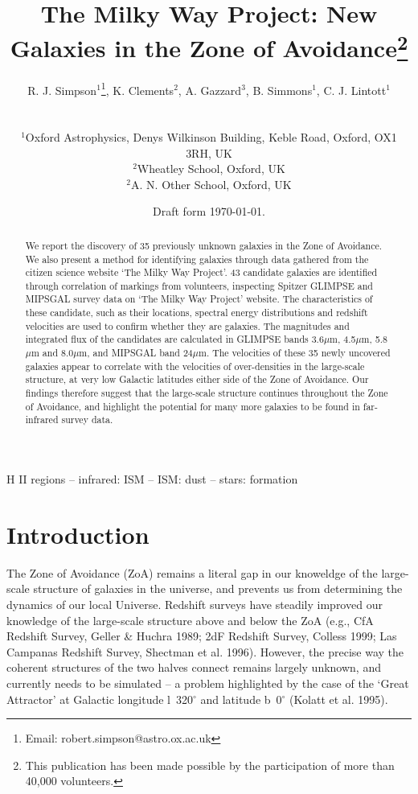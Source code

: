 \documentclass[times,usenatbib]{mn2e}
\title[New Galaxies in the ZoA]{The Milky Way Project: New Galaxies in the Zone of Avoidance\footnote{This publication has been made possible by the participation of more than 40,000 volunteers.}}
\author[Simpson et al.]
{\parbox{\textwidth}{R. J. Simpson$^{1}$\thanks{Email: robert.simpson@astro.ox.ac.uk},
K. Clements$^{2}$,
A. Gazzard$^{3}$,
B. Simmons$^{1}$,
C. J. Lintott$^{1}$}\vspace{0.8cm}\\
\parbox{\textwidth}{
$^{1}$Oxford Astrophysics, Denys Wilkinson Building, Keble Road, Oxford, OX1 3RH, UK \\
$^{2}$Wheatley School, Oxford, UK \\
$^{2}$A. N. Other School, Oxford, UK }}
\date{Draft form \today .}
\begin{document}
\label{firstpage}

\maketitle

\begin{abstract}

We report the discovery of 35 previously unknown galaxies in the Zone of Avoidance. We also present a method for identifying galaxies through data gathered from the citizen science website `The Milky Way Project'. 43 candidate galaxies are identified through correlation of markings from volunteers, inspecting Spitzer GLIMPSE and MIPSGAL survey data on `The Milky Way Project' website. The characteristics of these candidate, such as their locations, spectral energy distributions and redshift velocities are used to confirm whether they are galaxies. The magnitudes and integrated flux of the candidates are calculated in GLIMPSE bands 3.6$\mu$m, 4.5$\mu$m, 5.8$\mu$m and 8.0$\mu$m, and MIPSGAL band 24$\mu$m. The velocities of these 35 newly uncovered galaxies appear to correlate with the velocities of over-densities in the large-scale structure, at very low Galactic latitudes either side of the Zone of Avoidance. Our findings therefore suggest that the large-scale structure continues throughout the Zone of Avoidance, and highlight the potential for many more galaxies to be found in far-infrared survey data.

\end{abstract}
\begin{keywords}
H II regions -- infrared: ISM  -- ISM: dust -- stars: formation
\end{keywords}

\section{Introduction}

The Zone of Avoidance (ZoA) remains a literal gap in our knoweldge of the large-scale structure of galaxies in the universe, and prevents us from determining the dynamics of our local Universe. Redshift surveys have steadily improved our knowledge of the large-scale structure above and below the ZoA (e.g., CfA Redshift Survey, Geller \& Huchra 1989; 2dF Redshift Survey, Colless 1999; Las Campanas Redshift Survey, Shectman et al. 1996). However, the precise way the coherent structures of the two halves connect remains largely unknown, and currently needs to be simulated -- a problem highlighted by the case of the `Great Attractor' at Galactic longitude l~320$^{\circ}$ and latitude b~0$^{\circ}$ (Kolatt et al. 1995).
\end{document}
